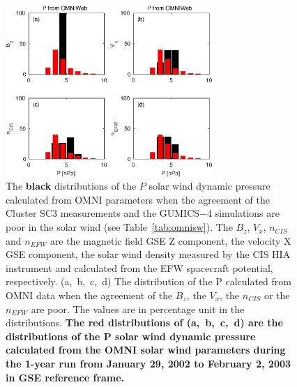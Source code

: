 \documentclass[linenumbers,draft]{agujournal}
\begin{document}
\begin{figure}[h]
\centering
\includegraphics[width=0.7\textwidth,angle=0]{swe-2021-corr-f15}  
\caption{The \textbf{black} distributions of the $P$ solar wind dynamic pressure calculated from OMNI parameters when the agreement of the Cluster SC3 measurements and the GUMICS$-$4 simulations are poor in the solar wind (see Table~\ref{tab:omnisw}). The $B_{z}$, $V_{x}$, $n_{CIS}$ and $n_{EFW}$ are the magnetic field GSE Z component, the velocity X GSE component, the solar wind density measured by the CIS HIA instrument and calculated from the EFW spacecraft potential, respectively. (a,~b,~c,~d) The distribution of the P calculated from OMNI data when the agreement of the $B_{z}$, the $V_{x}$, the $n_{CIS}$ or the $n_{EFW}$ are poor. The values are in percentage unit in the distributions. \textbf{The red distributions of (a,~b,~c,~d) are the distributions of the P solar wind dynamic pressure calculated from the OMNI solar wind parameters during the 1-year run from January 29, 2002 to February 2, 2003 in GSE reference frame.}}
\label{fig:swomnip}
\end{figure}

\pagebreak
\end{document}
